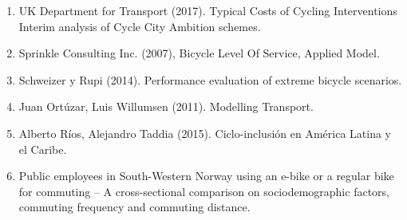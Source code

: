 \documentclass{article}
\begin{document}
\begin{enumerate}
    \item{\label{typicalcostsofcylcing} UK Department for Transport (2017). Typical Costs of Cycling Interventions Interim analysis of Cycle City Ambition schemes.}
    \item{\label{blos2007} Sprinkle Consulting Inc. (2007), Bicycle Level Of Service, Applied Model.}
    \item{\label{shwe2014} Schweizer y Rupi (2014). Performance evaluation of extreme bicycle scenarios.}
    \item{\label{ortuz2011} Juan Ortúzar, Luis Willumsen (2011). Modelling Transport.}
    \item{\label{rios2015} Alberto Ríos, Alejandro Taddia (2015). Ciclo-inclusión en América Latina y el Caribe.}
    \item{\label{anette2018} Public employees in South-Western Norway using an e-bike or a regular bike for commuting – A cross-sectional comparison on sociodemographic factors, commuting frequency and commuting distance.}
  \end{enumerate}
\end{document}

